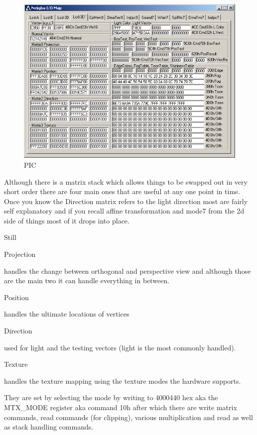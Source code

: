 \documentclass[
]{book}
\begin{document}
\begin{figure}
\centering
\includegraphics{images/62_home_fast6191_romhackingguide_unrenamed_file___l_borders_romhackingguidegraphics3dmatrix_2.png}
\caption{PIC}
\end{figure}

Although there is a matrix stack which allows things to be swapped out in very short order there are four main ones that are useful at any one point in time. Once you know the Direction matrix refers to the light direction most are fairly self explanatory and if you recall affine transformation and mode7 from the 2d side of things most of it drops into place.

Still

Projection

handles the change between orthogonal and perspective view and although those are the main two it can handle everything in between.

Position

handles the ultimate locations of vertices

Direction

used for light and the testing vectors (light is the most commonly handled).

Texture

handles the texture mapping using the texture modes the hardware supports.

They are set by selecting the mode by writing to 4000440 hex aka the MTX\_MODE register aka command 10h after which there are write matrix commands, read commands (for clipping), various multiplication and read as well as stack handling commands.
\end{document}
